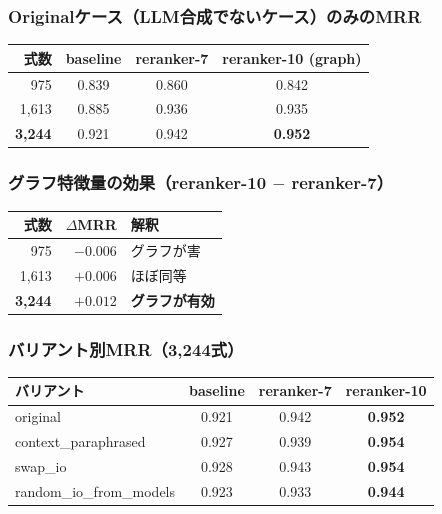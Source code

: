 \documentclass[11pt,a4paper]{ltjsarticle}
\begin{document}
\subsubsection{Originalケース（LLM合成でないケース）のみのMRR}

\begin{table}[h]
\centering
\begin{tabular}{rccc}
\toprule
式数 & baseline & reranker-7 & reranker-10 (graph) \\
\midrule
975 & 0.839 & 0.860 & 0.842 \\
1,613 & 0.885 & 0.936 & 0.935 \\
\textbf{3,244} & 0.921 & 0.942 & \textbf{0.952} \\
\bottomrule
\end{tabular}
\end{table}

\subsubsection{グラフ特徴量の効果（reranker-10 $-$ reranker-7）}

\begin{table}[h]
\centering
\begin{tabular}{rrl}
\toprule
式数 & $\Delta$MRR & 解釈 \\
\midrule
975 & $-0.006$ & グラフが害 \\
1,613 & $+0.006$ & ほぼ同等 \\
\textbf{3,244} & $\mathbf{+0.012}$ & \textbf{グラフが有効} \\
\bottomrule
\end{tabular}
\end{table}

\subsubsection{バリアント別MRR（3,244式）}

\begin{table}[h]
\centering
\begin{tabular}{lccc}
\toprule
バリアント & baseline & reranker-7 & reranker-10 \\
\midrule
original & 0.921 & 0.942 & \textbf{0.952} \\
context\_paraphrased & 0.927 & 0.939 & \textbf{0.954} \\
swap\_io & 0.928 & 0.943 & \textbf{0.954} \\
random\_io\_from\_models & 0.923 & 0.933 & \textbf{0.944} \\
\bottomrule
\end{tabular}
\end{table}
\end{document}
